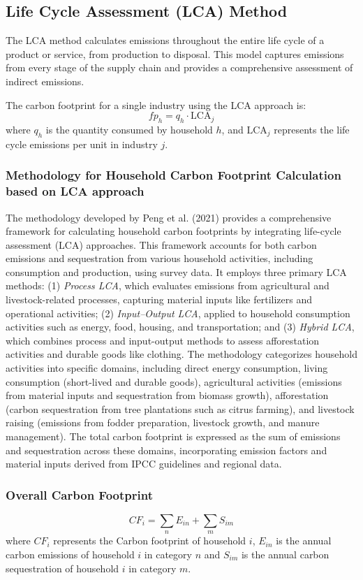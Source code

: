 \documentclass[12pt,a4paper]{article}
\begin{document}
\subsection{Life Cycle Assessment (LCA) Method}
The LCA method calculates emissions throughout the entire life cycle of a product or service, from production to disposal. This model captures emissions from every stage of the supply chain and provides a comprehensive assessment of indirect emissions.

The carbon footprint for a single industry using the LCA approach is:
\[
fp_h = q_h \cdot \text{LCA}_j
\]
where \(q_h\) is the quantity consumed by household \(h\), and \(\text{LCA}_j\) represents the life cycle emissions per unit in industry \(j\).


\subsubsection{Methodology for Household Carbon Footprint Calculation based on LCA approach}

The methodology developed by Peng et al. (2021) provides a comprehensive framework for calculating household carbon footprints by integrating life-cycle assessment (LCA) approaches. This framework accounts for both carbon emissions and sequestration from various household activities, including consumption and production, using survey data. It employs three primary LCA methods: (1) \textit{Process LCA}, which evaluates emissions from agricultural and livestock-related processes, capturing material inputs like fertilizers and operational activities; (2) \textit{Input–Output LCA}, applied to household consumption activities such as energy, food, housing, and transportation; and (3) \textit{Hybrid LCA}, which combines process and input-output methods to assess afforestation activities and durable goods like clothing. The methodology categorizes household activities into specific domains, including direct energy consumption, living consumption (short-lived and durable goods), agricultural activities (emissions from material inputs and sequestration from biomass growth), afforestation (carbon sequestration from tree plantations such as citrus farming), and livestock raising (emissions from fodder preparation, livestock growth, and manure management). The total carbon footprint is expressed as the sum of emissions and sequestration across these domains, incorporating emission factors and material inputs derived from IPCC guidelines and regional data. 
\subsubsection*{Overall Carbon Footprint}
\begin{equation}
CF_i = \sum_{n} E_{in} + \sum_{m} S_{im}
\end{equation}
where $CF_i$ represents the Carbon footprint of household $i$, $E_{in}$ is the annual carbon emissions of household $i$ in category $n$ and $S_{im}$ is the annual carbon sequestration of household $i$ in category $m$.
\end{document}
